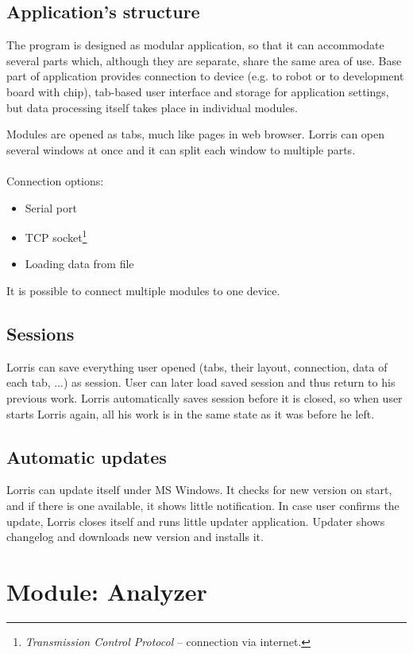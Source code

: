 \documentclass[12pt, a4paper, oneside]{article}
\newcommand{\It}{\textit}  %
\begin{document}
\subsection{Application's structure}
The program is designed as modular application, so that it can accommodate several parts which, although they are separate, share the same area of use.
Base part of application provides connection to device (e.g. to robot or to development board with chip), tab-based user interface and storage for application settings, but data processing itself takes place in individual modules.

Modules are opened as tabs, much like pages in web browser. Lorris can open several windows at once and it can split each window to multiple parts.\\
\\
\noindent Connection options:
\begin{itemize}
    \item Serial port
    \item TCP socket\footnote{\It{Transmission Control Protocol} -- connection via internet.}
    \item Loading data from file
\end{itemize}
It is possible to connect multiple modules to one device.

\subsection{Sessions}
Lorris can save everything user opened (tabs, their layout, connection, data of each tab, ...) as session. User can later load saved session and thus return to his previous work. Lorris automatically saves session before it is closed, so when user starts Lorris again, all his work is in the same state as it was before he left.

\subsection{Automatic updates}
Lorris can update itself under MS Windows. It checks for new version on start, and if there is one available, it shows little notification. In case user confirms the update, Lorris closes itself and runs little updater application. Updater shows changelog and downloads new version and installs it.

\section{Module: Analyzer}
\end{document}
